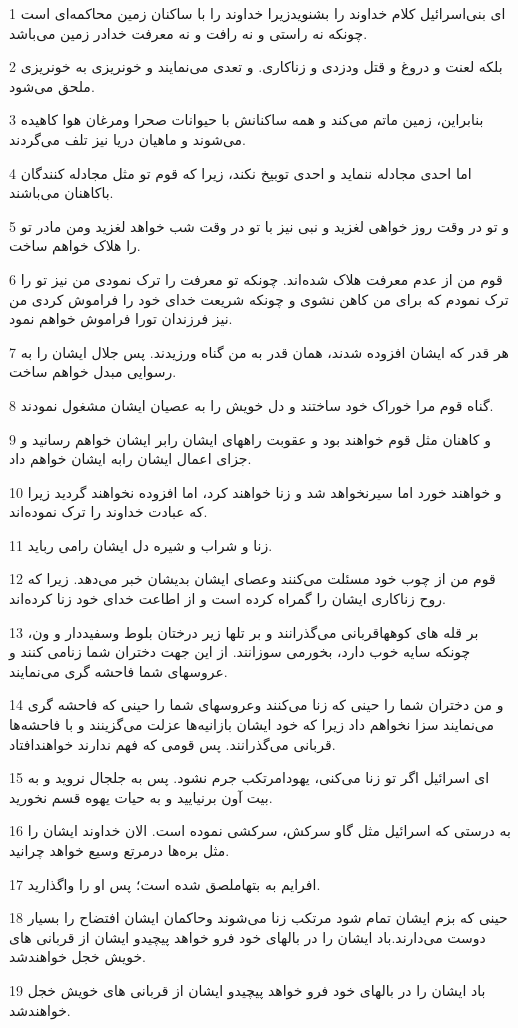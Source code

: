 \par 1 ای بنی‌اسرائیل کلام خداوند را بشنویدزیرا خداوند را با ساکنان زمین محاکمه‌ای است چونکه نه راستی و نه رافت و نه معرفت خدادر زمین می‌باشد.
\par 2 بلکه لعنت و دروغ و قتل ودزدی و زناکاری. و تعدی می‌نمایند و خونریزی به خونریزی ملحق می‌شود.
\par 3 بنابراین، زمین ماتم می‌کند و همه ساکنانش با حیوانات صحرا ومرغان هوا کاهیده می‌شوند و ماهیان دریا نیز تلف می‌گردند.
\par 4 اما احدی مجادله ننماید و احدی توبیخ نکند، زیرا که قوم تو مثل مجادله کنندگان باکاهنان می‌باشند.
\par 5 و تو در وقت روز خواهی لغزید و نبی نیز با تو در وقت شب خواهد لغزید ومن مادر تو را هلاک خواهم ساخت.
\par 6 قوم من از عدم معرفت هلاک شده‌اند. چونکه تو معرفت را ترک نمودی من نیز تو را ترک نمودم که برای من کاهن نشوی و چونکه شریعت خدای خود را فراموش کردی من نیز فرزندان تورا فراموش خواهم نمود.
\par 7 هر قدر که ایشان افزوده شدند، همان قدر به من گناه ورزیدند. پس جلال ایشان را به رسوایی مبدل خواهم ساخت.
\par 8 گناه قوم مرا خوراک خود ساختند و دل خویش را به عصیان ایشان مشغول نمودند.
\par 9 و کاهنان مثل قوم خواهند بود و عقوبت راههای ایشان رابر ایشان خواهم رسانید و جزای اعمال ایشان رابه ایشان خواهم داد.
\par 10 و خواهند خورد اما سیرنخواهد شد و زنا خواهند کرد، اما افزوده نخواهند گردید زیرا که عبادت خداوند را ترک نموده‌اند.
\par 11 زنا و شراب و شیره دل ایشان رامی رباید.
\par 12 قوم من از چوب خود مسئلت می‌کنند وعصای ایشان بدیشان خبر می‌دهد. زیرا که روح زناکاری ایشان را گمراه کرده است و از اطاعت خدای خود زنا کرده‌اند.
\par 13 بر قله های کوههاقربانی می‌گذرانند و بر تلها زیر درختان بلوط وسفیددار و ون، چونکه سایه خوب دارد، بخورمی سوزانند. از این جهت دختران شما زنامی کنند و عروسهای شما فاحشه گری می‌نمایند.
\par 14 و من دختران شما را حینی که زنا می‌کنند وعروسهای شما را حینی که فاحشه گری می‌نمایند سزا نخواهم داد زیرا که خود ایشان بازانیه‌ها عزلت می‌گزینند و با فاحشه‌ها قربانی می‌گذرانند. پس قومی که فهم ندارند خواهندافتاد.
\par 15 ‌ای اسرائیل اگر تو زنا می‌کنی، یهودامرتکب جرم نشود. پس به جلجال نروید و به بیت آون برنیایید و به حیات یهوه قسم نخورید.
\par 16 به درستی که اسرائیل مثل گاو سرکش، سرکشی نموده است. الان خداوند ایشان را مثل بره‌ها درمرتع وسیع خواهد چرانید.
\par 17 افرایم به بتهاملصق شده است؛ پس او را واگذارید.
\par 18 حینی که بزم ایشان تمام شود مرتکب زنا می‌شوند وحاکمان ایشان افتضاح را بسیار دوست می‌دارند.باد ایشان را در بالهای خود فرو خواهد پیچیدو ایشان از قربانی های خویش خجل خواهندشد.
\par 19 باد ایشان را در بالهای خود فرو خواهد پیچیدو ایشان از قربانی های خویش خجل خواهندشد.

